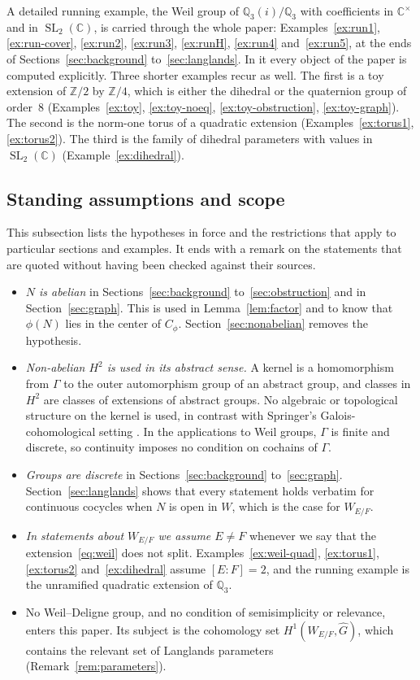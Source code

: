 \documentclass[12pt,letterpaper]{article}
\numberwithin{equation}{section}
\theoremstyle{plain}
\theoremstyle{definition}
\newcommand{\Z}{\mathbb{Z}}
\newcommand{\C}{\mathbb{C}}
\newcommand{\Q}{\mathbb{Q}}
\newcommand{\Gh}{\widehat{G}}
\DeclareMathOperator{\SL}{SL}
\begin{document}
A detailed running example, the Weil group of $\Q_3(i)/\Q_3$ with
coefficients in $\C^\times$ and in $\SL_2(\C)$, is carried through the
whole paper: Examples~\ref{ex:run1}, \ref{ex:run-cover}, \ref{ex:run2}, \ref{ex:run3},
\ref{ex:runH}, \ref{ex:run4} and~\ref{ex:run5}, at the ends of
Sections~\ref{sec:background} to~\ref{sec:langlands}. In it every object
of the paper is computed explicitly. Three shorter examples recur as
well. The first is a toy extension of $\Z/2$ by $\Z/4$, which is either
the dihedral or the quaternion group of order~$8$
(Examples~\ref{ex:toy}, \ref{ex:toy-noeq}, \ref{ex:toy-obstruction},
\ref{ex:toy-graph}). The second is the norm-one torus of a quadratic
extension (Examples~\ref{ex:torus1}, \ref{ex:torus2}). The third is the
family of dihedral parameters with values in $\SL_2(\C)$
(Example~\ref{ex:dihedral}).

\subsection{Standing assumptions and scope}\label{ss:scope}

This subsection lists the hypotheses in force and the restrictions that
apply to particular sections and examples. It ends with a remark on the
statements that are quoted without having been checked against their
sources.

\begin{itemize}[itemsep=2pt]
\item \emph{$N$ is abelian} in Sections~\ref{sec:background}
to~\ref{sec:obstruction} and in Section~\ref{sec:graph}. This is used in
Lemma~\ref{lem:factor} and to know that $\phi(N)$ lies in the center of
$C_\phi$. Section~\ref{sec:nonabelian} removes the hypothesis.
\item \emph{Non-abelian $H^2$ is used in its abstract sense.} A kernel is
a homomorphism from $\Gamma$ to the outer automorphism group of an
abstract group, and classes in $H^2$ are classes of extensions of abstract
groups. No algebraic or topological structure on the kernel is used, in
contrast with Springer's Galois-cohomological setting \cite{Sp66}. In the
applications to Weil groups, $\Gamma$ is finite and discrete, so
continuity imposes no condition on cochains of $\Gamma$.
\item \emph{Groups are discrete} in Sections~\ref{sec:background}
to~\ref{sec:graph}. Section~\ref{sec:langlands} shows that every statement
holds verbatim for continuous cocycles when $N$ is open in $W$, which is
the case for $W_{E/F}$.
\item \emph{In statements about $W_{E/F}$ we assume $E\neq F$} whenever we
say that the extension~\eqref{eq:weil} does not split.
Examples~\ref{ex:weil-quad}, \ref{ex:torus1}, \ref{ex:torus2}
and~\ref{ex:dihedral} assume $[E:F]=2$, and the running example is the
unramified quadratic extension of $\Q_3$.
\item No Weil--Deligne group, and no condition of semisimplicity or
relevance, enters this paper. Its subject is the cohomology set
$H^1(W_{E/F},\Gh)$, which contains the relevant set of Langlands parameters
(Remark~\ref{rem:parameters}).
\end{itemize}
\end{document}
